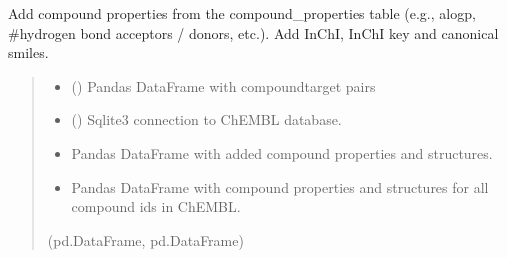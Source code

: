 \documentclass[letterpaper,10pt,english]{sphinxmanual}
\begin{document}

\begin{fulllineitems}
\label{\detokenize{add_chembl_compound_properties:add_chembl_compound_properties.add_chembl_properties_and_structures}}
\pysigstartsignatures
{}
\pysigstopsignatures
\sphinxAtStartPar
Add compound properties from the compound\_properties table
(e.g., alogp, \#hydrogen bond acceptors / donors, etc.).
Add InChI, InChI key and canonical smiles.
\begin{quote}\begin{description}
\begin{itemize}
\item {} 
\sphinxAtStartPar
{} () \textendash{} Pandas DataFrame with compound\sphinxhyphen{}target pairs

\item {} 
\sphinxAtStartPar
{} () \textendash{} Sqlite3 connection to ChEMBL database.

\end{itemize}

\sphinxAtStartPar
\begin{itemize}
\item {} 
\sphinxAtStartPar
Pandas DataFrame with added compound properties and structures. 

\item {} 
\sphinxAtStartPar
Pandas DataFrame with compound properties and structures for all compound ids in ChEMBL.

\end{itemize}


\sphinxAtStartPar
(pd.DataFrame, pd.DataFrame)

\end{description}\end{quote}

\end{fulllineitems}
\end{document}
